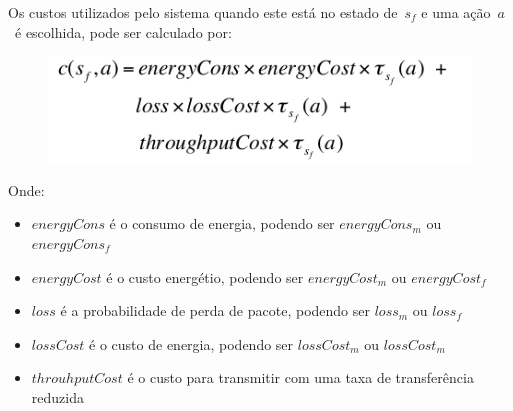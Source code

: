 \begin{frame}
  \footnotesize Os custos utilizados pelo sistema quando este está no estado
  de \alert{$s_{f}$} e uma ação \alert{$a$} é escolhida, pode ser calculado por:
  \begin{figure}
    \includegraphics[scale=0.37]{./Figures/form4}
  \end{figure}
  \scriptsize Onde:
  \begin{itemize}
    \item \alert{$energyCons$} é o consumo de energia, podendo ser \alert{$energyCons_{m}$} ou \alert{$energyCons_{f}$}
    \item \alert{$energyCost$} é o custo energétio, podendo ser \alert{$energyCost_{m}$} ou \alert{$energyCost_{f}$}
    \item \alert{$loss$} é a probabilidade de perda de pacote, podendo ser \alert{$loss_{m}$} ou \alert {$loss_{f}$}
    \item \alert{$lossCost$} é o custo de energia, podendo ser \alert{$lossCost_{m}$} ou \alert{$lossCost_{m}$}
    \item \alert{$throuhputCost$} é o custo para transmitir com uma taxa de transferência reduzida
  \end{itemize}
\end{frame}
%
%
%
